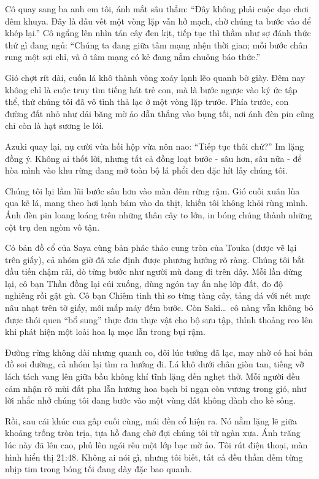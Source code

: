 \documentclass[../main.tex]{subfiles}
\begin{document}
Cô quay sang ba anh em tôi, ánh mắt sâu thẳm: ``Đây không phải cuộc dạo chơi đêm khuya. Đây là dấu vết một vòng lặp vẫn hở mạch, chờ chúng ta bước vào để khép lại.'' Cô ngẩng lên nhìn tán cây đen kịt, tiếp tục thì thầm như sợ đánh thức thứ gì đang ngủ: ``Chúng ta đang giữa tấm mạng nhện thời gian; mỗi bước chân rung một sợi chỉ, và ở tâm mạng có kẻ đang nắm chuông báo thức.''

Gió chợt rít dài, cuốn lá khô thành vòng xoáy lạnh lẽo quanh bờ giày. Đêm nay không chỉ là cuộc truy tìm tiếng hát trẻ con, mà là bước ngược vào ký ức tập thể, thứ chúng tôi đã vô tình thả lạc ở một vòng lặp trước. Phía trước, con đường đất nhỏ như dải băng mờ ảo dẫn thẳng vào bụng tối, nơi ánh đèn pin cũng chỉ còn là hạt sương le lói.

Azuki quay lại, nụ cười vừa hồi hộp vừa nôn nao: ``Tiếp tục thôi chứ?'' Im lặng đồng ý. Không ai thốt lời, nhưng tất cả đồng loạt bước - sâu hơn, sâu nữa - để hòa mình vào khu rừng đang mở toàn bộ lá phổi đen đặc hít lấy chúng tôi.

\ct

Chúng tôi lại lầm lũi bước sâu hơn vào màn đêm rừng rậm. Gió cuối xuân lùa qua kẽ lá, mang theo hơi lạnh bám vào da thịt, khiến tôi không khỏi rùng mình. Ánh đèn pin loang loáng trên những thân cây to lớn, in bóng chúng thành những cột trụ đen ngòm vô tận.

Có bản đồ cổ của Saya cùng bản phác thảo cung tròn của Touka (được vẽ lại trên giấy), cả nhóm giờ đã xác định được phương hướng rõ ràng. Chúng tôi bắt đầu tiến chậm rãi, dò từng bước như người mù đang đi trên dây. Mỗi lần dừng lại, cô bạn Thần đồng lại cúi xuống, dùng ngón tay ấn nhẹ lớp đất, đo độ nghiêng rồi gật gù. Cô bạn Chiêm tinh thì so từng tàng cây, tảng đá với nét mực nâu nhạt trên tờ giấy, môi mấp máy đếm bước. Còn Saki\dots\ cô nàng vẫn không bỏ được thói quen ``bổ sung'' thực đơn thực vật cho bộ sưu tập, thỉnh thoảng reo lên khi phát hiện một loài hoa lạ mọc lẫn trong bụi rậm.

Đường rừng không dài nhưng quanh co, đôi lúc tưởng đã lạc, may nhờ có hai bản đồ soi đường, cả nhóm lại tìm ra hướng đi. Lá khô dưới chân giòn tan, tiếng vỡ lách tách vang lên giữa bầu không khí tĩnh lặng đến nghẹt thở. Mỗi người đều cảm nhận rõ mùi đất pha lẫn hương hoa bạch bỉ ngạn còn vương trong gió, như lời nhắc nhở chúng tôi đang bước vào một vùng đất không dành cho kẻ sống.

Rồi, sau cái khúc cua gấp cuối cùng, mái đền cổ hiện ra. Nó nằm lặng lẽ giữa khoảng trống tròn trịa, tựa hồ đang chờ đợi chúng tôi từ ngàn xưa. Ánh trăng lúc này đã lên cao, phủ lên ngói rêu một lớp bạc mờ ảo. Tôi rút điện thoại, màn hình hiển thị 21:48. Không ai nói gì, nhưng tôi biết, tất cả đều thầm đếm từng nhịp tim trong bóng tối đang dày đặc bao quanh.
\end{document}

